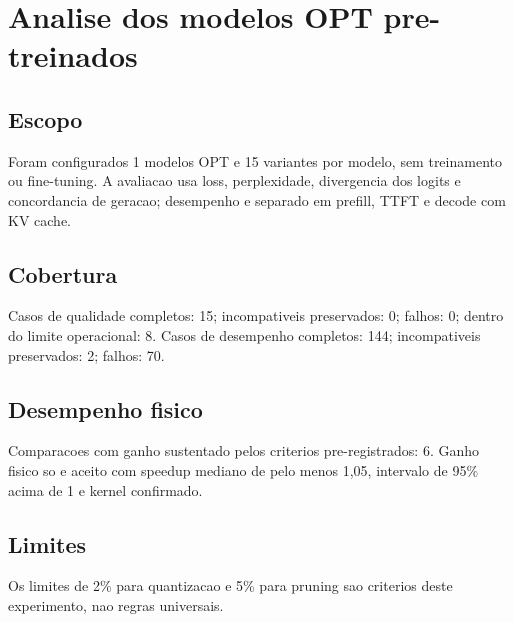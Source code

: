 \chapter{Analise dos modelos OPT pre-treinados}
\section{Escopo}
Foram configurados 1 modelos OPT e 15 variantes por modelo, sem treinamento ou fine-tuning.
A avaliacao usa loss, perplexidade, divergencia dos logits e concordancia de geracao; desempenho e separado em prefill, TTFT e decode com KV cache.
\section{Cobertura}
Casos de qualidade completos: 15; incompativeis preservados: 0; falhos: 0; dentro do limite operacional: 8.
Casos de desempenho completos: 144; incompativeis preservados: 2; falhos: 70.
\section{Desempenho fisico}
Comparacoes com ganho sustentado pelos criterios pre-registrados: 6.
Ganho fisico so e aceito com speedup mediano de pelo menos 1,05, intervalo de 95\% acima de 1 e kernel confirmado.
\section{Limites}
Os limites de 2\% para quantizacao e 5\% para pruning sao criterios deste experimento, nao regras universais.
